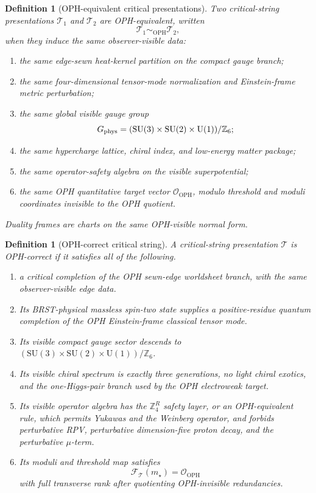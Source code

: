 \documentclass[11pt]{article}
\newtheorem{definition}[theorem]{Definition}
\theoremstyle{remark}
\theoremstyle{plain}
\newcommand{\OPH}{\mathrm{OPH}}
\newcommand{\SU}{\mathrm{SU}}
\newcommand{\U}{\mathrm{U}}
\newcommand{\Z}{\mathbb Z}
\newcommand{\calF}{\mathcal F}
\newcommand{\calO}{\mathcal O}
\newcommand{\ZfourR}{\mathbb Z_4^R}
\newcommand{\Teq}{\sim_{\OPH}}
\begin{document}
\begin{definition}[OPH-equivalent critical presentations]
Two critical-string presentations \(\mathcal T_1\) and \(\mathcal T_2\) are OPH-equivalent,
written
\[
\mathcal T_1\Teq\mathcal T_2,
\]
when they induce the same observer-visible data:
\begin{enumerate}[leftmargin=2em]
\item the same edge-sewn heat-kernel partition on the compact gauge branch;
\item the same four-dimensional tensor-mode normalization and Einstein-frame metric perturbation;
\item the same global visible gauge group
\[
G_{\rm phys}=(\SU(3)\times\SU(2)\times\U(1))/\Z_6;
\]
\item the same hypercharge lattice, chiral index, and low-energy matter package;
\item the same operator-safety algebra on the visible superpotential;
\item the same OPH quantitative target vector \(\calO_{\OPH}\), modulo threshold and moduli
coordinates invisible to the OPH quotient.
\end{enumerate}
Duality frames are charts on the same OPH-visible normal form.
\end{definition}

\begin{definition}[OPH-correct critical string]
A critical-string presentation \(\mathcal T\) is OPH-correct if it satisfies all of the following.
\begin{enumerate}[leftmargin=2em]
\item a critical completion of the OPH sewn-edge worldsheet branch, with the same
observer-visible edge data.
\item Its BRST-physical massless spin-two state supplies a positive-residue quantum completion of
the OPH Einstein-frame classical tensor mode.
\item Its visible compact gauge sector descends to
\((\SU(3)\times\SU(2)\times\U(1))/\Z_6\).
\item Its visible chiral spectrum is exactly three generations, no light chiral exotics, and the
one-Higgs-pair branch used by the OPH electroweak target.
\item Its visible operator algebra has the \(\ZfourR\) safety layer, or an OPH-equivalent rule,
which permits Yukawas and the Weinberg operator, and forbids perturbative RPV, perturbative
dimension-five proton decay, and the perturbative \(\mu\)-term.
\item Its moduli and threshold map satisfies
\[
\calF_{\mathcal T}(m_\star)=\calO_{\OPH}
\]
with full transverse rank after quotienting OPH-invisible redundancies.
\end{enumerate}
\end{definition}
\end{document}
